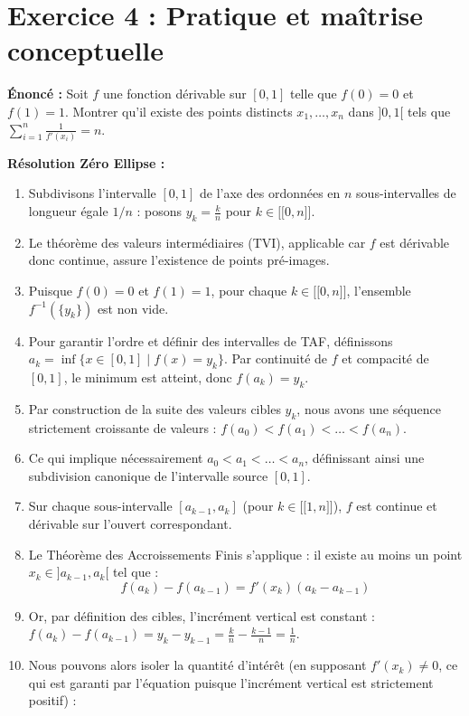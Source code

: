 \documentclass[11pt,a4paper]{article}
\begin{document}
\vspace{1em}

\section*{Exercice 4 : Pratique et maîtrise conceptuelle}

\textbf{Énoncé :}
Soit $f$ une fonction dérivable sur $[0,1]$ telle que $f(0)=0$ et $f(1)=1$. Montrer qu'il existe des points distincts $x_1, \dots, x_n$ dans $]0,1[$ tels que $\sum_{i=1}^n \frac{1}{f'(x_i)} = n$.

\textbf{Résolution Zéro Ellipse :}
\begin{enumerate}
\item Subdivisons l'intervalle $[0,1]$ de l'axe des ordonnées en $n$ sous-intervalles de longueur égale $1/n$ : posons $y_k = \frac{k}{n}$ pour $k \in \mathopen{[\![} 0, n \mathclose{]\!]}$.
\item Le théorème des valeurs intermédiaires (TVI), applicable car $f$ est dérivable donc continue, assure l'existence de points pré-images.
\item Puisque $f(0) = 0$ et $f(1) = 1$, pour chaque $k \in \mathopen{[\![} 0, n \mathclose{]\!]}$, l'ensemble $f^{-1}(\{y_k\})$ est non vide.
\item Pour garantir l'ordre et définir des intervalles de TAF, définissons $a_k = \inf \{ x \in [0,1] \mid f(x) = y_k \}$. Par continuité de $f$ et compacité de $[0,1]$, le minimum est atteint, donc $f(a_k) = y_k$.
\item Par construction de la suite des valeurs cibles $y_k$, nous avons une séquence strictement croissante de valeurs : $f(a_0) < f(a_1) < \dots < f(a_n)$.
\item Ce qui implique nécessairement $a_0 < a_1 < \dots < a_n$, définissant ainsi une subdivision canonique de l'intervalle source $[0,1]$.
\item Sur chaque sous-intervalle $[a_{k-1}, a_k]$ (pour $k \in \mathopen{[\![} 1, n \mathclose{]\!]}$), $f$ est continue et dérivable sur l'ouvert correspondant.
\item Le Théorème des Accroissements Finis s'applique : il existe au moins un point $x_k \in ]a_{k-1}, a_k[$ tel que :
   \[  f(a_k) - f(a_{k-1}) = f'(x_k)(a_k - a_{k-1})  \]
\item Or, par définition des cibles, l'incrément vertical est constant : $f(a_k) - f(a_{k-1}) = y_k - y_{k-1} = \frac{k}{n} - \frac{k-1}{n} = \frac{1}{n}$.
\item Nous pouvons alors isoler la quantité d'intérêt (en supposant $f'(x_k) \neq 0$, ce qui est garanti par l'équation puisque l'incrément vertical est strictement positif) :

\end{enumerate}
\end{document}
